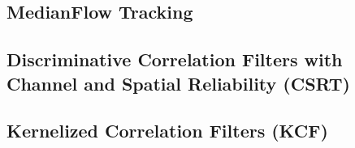 \documentclass[12pt]{article}
\begin{document}
\subsection{MedianFlow Tracking}

\subsection{Discriminative Correlation Filters with Channel and Spatial Reliability (CSRT)}

\subsection{Kernelized Correlation Filters (KCF)}



\end{document}
